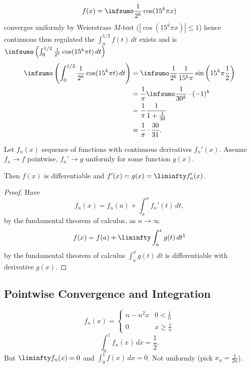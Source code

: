 \documentclass[10pt, a4paper]{article}
\begin{document}
\[
f(x) = \infsumo\frac{1}{2 ^ k}\cos(15 ^ k\pi x)
\]
converges uniformly by Weierstrass $M$-test
($|\cos(15 ^ k\pi x)| \leq 1$)
hence continuous thus regulated the $\int_{0}^{1 / 2}f(t)\,dt$ exists and is $\infsumo\left(\int_{0}^{1 / 2}\frac{1}{2 ^ k}\cos(15 ^ k\pi t)\,dt\right)$
\begin{align*}
    \infsumo\left(\int_{0}^{1 / 2}\frac{1}{2 ^ k}\cos(15 ^ k\pi t)\,dt\right) &= \infsumo\frac{1}{2 ^ k}\frac{1}{15 ^ k\pi}\sin\left(15 ^ k\pi\frac{1}{2}\right) \\
    &= \frac{1}{\pi}\infsumo\frac{1}{30 ^ k}\cdot (-1) ^ k \\
    &= \frac{1}{\pi}\frac{1}{1 + \frac{1}{30}} \\
    &= \frac{1}{\pi}\cdot\frac{30}{31}.
\end{align*}

\begin{theorem}
    Let $f_n(x)$ sequence of functions with continuous derivatives $f_n'(x)$.
    Assume $f_n \to f$ pointwise,
    $f_n' \to g$ uniformly for some function $g(x)$.

    Then $f(x)$ is differentiable and $f'(x) = g(x) = \liminfty f_n'(x)$.

    \begin{proof}
        Have
        \[
        f_n(x) = f_n(a) + \int_{a}^{x}f_n'(t)\,dt,
        \]
        by the fundamental theorem of calculus,
        as $n \to \infty$
        \[
        f(x) = f(a) + \liminfty\int_{a}^{x}g(t)\,dt\footnotemark
        \]
        by the fundamental theorem of calculus $\int_{a}^{x}g(t)\,dt$ is differentiable with derivative $g(x)$.
    \end{proof}
\end{theorem}

\subsection{Pointwise Convergence and Integration}

\begin{example}
    \[
    f_n(x) = \begin{cases}
        n - n ^ 2x & 0 < \frac{1}{n} \\
        0 & x \geq \frac{1}{n}
    \end{cases}
    \]
    \[
    \int_{0}^{1}f_n(x)\,dx = \frac{1}{2}.
    \]
    But $\liminfty f_n(x) = 0$ and $\int_{0}^{1}f(x)\,dx = 0$.
    Not uniformly
    (pick $x_n = \frac{1}{2n}$).
\end{example}
\end{document}
